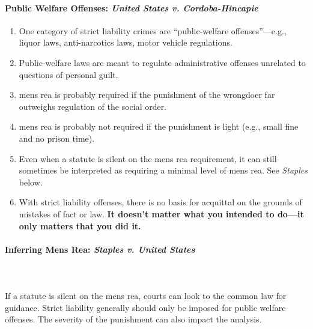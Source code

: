 \paragraph{Public Welfare Offenses: \emph{United States v. Cordoba-Hincapie}}

\begin{enumerate}
    \item One category of strict liability crimes are ``public-welfare 
    offenses''---e.g., liquor laws, anti-narcotics laws, motor vehicle 
    regulations.
    \item Public-welfare laws are meant to regulate administrative offenses 
    unrelated to questions of personal guilt.
    \item mens rea is probably required if the punishment of the wrongdoer far 
    outweighs regulation of the social order.
    \item mens rea is probably not required if the punishment is light (e.g., 
    small fine and no prison time).
    \item Even when a statute is silent on the mens rea requirement, it can 
    still sometimes be interpreted as requiring a minimal level of mens rea. 
    See \emph{Staples} below.
    \item With strict liability offenses, there is no basis for acquittal on 
    the grounds of mistakes of fact or law. \textbf{It doesn't matter what you 
    intended to do---it only matters that you did it.}
\end{enumerate}

\paragraph{Inferring Mens Rea: \emph{Staples v. United States}}
~\\\\
If a statute is silent on the mens rea, courts can look to the common law for 
guidance. Strict liability generally should only be imposed for public welfare 
offenses. The severity of the punishment can also impact the analysis.

